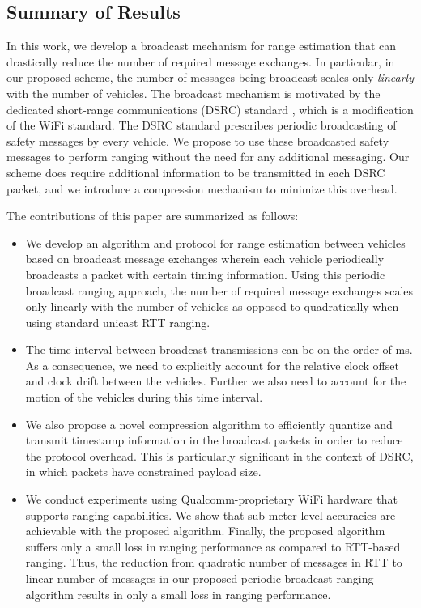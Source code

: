 \documentclass[12pt,journal,final,onecolumn]{IEEEtran}
\theoremstyle{definition}
\theoremstyle{myremark}
\begin{document}
\subsection{Summary of Results}
\label{sec:intro_summary}

In this work, we develop a broadcast mechanism for range estimation that can
drastically reduce the number of required message exchanges. In particular, in
our proposed scheme, the number of messages being broadcast scales only
\emph{linearly} with the number of vehicles. The broadcast mechanism is motivated
by the dedicated short-range communications (DSRC) standard \cite{dsrc}, which
is a modification of the WiFi standard. The DSRC standard prescribes periodic
broadcasting of safety messages by every vehicle. We propose to use these
broadcasted safety messages to perform ranging without the need for any
additional messaging. Our scheme does require additional information to be
transmitted in each DSRC packet, and we introduce a compression mechanism to
minimize this overhead. 

The contributions of this paper are summarized as follows:

\begin{itemize}
    \item We develop an algorithm and protocol for range estimation between
        vehicles based on broadcast message exchanges wherein each vehicle
        periodically broadcasts a packet with certain timing information. Using
        this periodic broadcast ranging approach, the number of required message
        exchanges scales only linearly with the number of vehicles as opposed to
        quadratically when using standard unicast RTT ranging.
    \item The time interval between broadcast transmissions can be on the order of
         ms.  As a consequence, we need to explicitly account for the
        relative clock offset and clock drift between the vehicles. Further we
        also need to account for the motion of the vehicles during this time
        interval.
    \item We also propose a novel compression algorithm to efficiently quantize
        and transmit timestamp information in the broadcast packets in order to
        reduce the protocol overhead. This is particularly significant in the
        context of DSRC, in which packets have constrained payload size.
    \item We conduct experiments using Qualcomm-proprietary WiFi hardware that
        supports ranging capabilities. We show that sub-meter level accuracies
        are achievable with the proposed algorithm. Finally, the proposed
        algorithm suffers only a small loss in ranging performance
        as compared to RTT-based ranging. Thus, the reduction from quadratic
        number of messages in RTT to linear number of messages in our proposed
        periodic broadcast ranging algorithm results in only a small loss in
        ranging performance.
\end{itemize}
\end{document}
